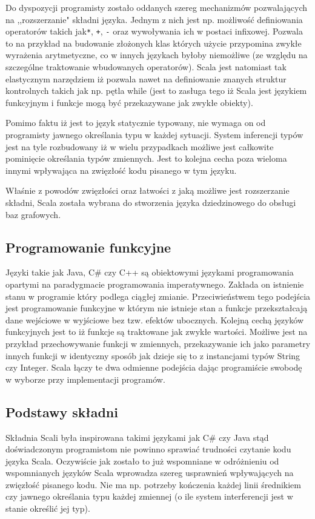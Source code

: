 \documentclass[brudnopis]{xmgr}
\begin{document}
Do dyspozycji programisty zostało oddanych szereg mechanizmów pozwalających na ,,rozszerzanie" składni języka. Jednym z nich jest np. możliwość definiowania operatorów takich jak\texttt{*}, \texttt{+}, \texttt{-} oraz wywoływania ich w postaci infixowej. Pozwala to na przykład na budowanie złożonych klas których użycie przypomina zwykłe wyrażenia arytmetyczne, co w innych językach byłoby niemożliwe (ze względu na szczególne traktowanie wbudowanych operatorów). Scala jest natomiast tak elastycznym narzędziem iż pozwala nawet na definiowanie znanych struktur kontrolnych takich jak np. pętla while (jest to zasługa tego iż Scala jest językiem funkcyjnym i funkcje mogą być przekazywane jak zwykłe obiekty).

Pomimo faktu iż jest to język statycznie typowany, nie wymaga on od programisty jawnego określania typu w każdej sytuacji. System inferencji typów jest na tyle rozbudowany iż w wielu przypadkach możliwe jest całkowite pominięcie określania typów zmiennych. Jest to kolejna cecha poza wieloma innymi wpływająca na zwięzłość kodu pisanego w tym języku.

Właśnie z powodów zwięzłości oraz łatwości z jaką możliwe jest rozszerzanie składni, Scala została wybrana do stworzenia języka dziedzinowego do obsługi baz grafowych.

\subsection{Programowanie funkcyjne}

Języki takie jak Java, C\# czy C++ są obiektowymi językami programowania opartymi na paradygmacie programowania imperatywnego. Zakłada on istnienie stanu w programie który podlega ciągłej zmianie. Przeciwieństwem tego podejścia jest programowanie funkcyjne w którym nie istnieje stan a funkcje przekształcają dane wejściowe w wyjściowe bez tzw. efektów ubocznych. Kolejną cechą języków funkcyjnych jest to iż funkcje są traktowane jak zwykłe wartości. Możliwe jest na przykład przechowywanie funkcji w zmiennych, przekazywanie ich jako parametry innych funkcji w identyczny sposób jak dzieje się to z instancjami typów String czy Integer. Scala łączy te dwa odmienne podejścia dając programiście swobodę w wyborze przy implementacji programów.

\subsection{Podstawy składni}
Składnia Scali była inspirowana takimi językami jak C\# czy Java stąd doświadczonym programistom nie powinno sprawiać trudności czytanie kodu języka Scala. Oczywiście jak zostało to już wspomniane w odróżnieniu od wspomnianych języków Scala wprowadza szereg usprawnień wpływających na zwięzłość pisanego kodu. Nie ma np. potrzeby kończenia każdej linii średnikiem czy jawnego określania typu każdej zmiennej (o ile system interferencji jest w stanie określić jej typ).
\end{document}
